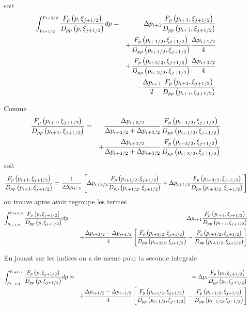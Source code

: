 soit 
\begin{eqnarray*}
\int_{p_{i+1/2}}^{p_{i+3/2}}\frac{F_{p}\left(p,\xi_{j+1/2}\right)}{%
D_{pp}\left(p,\xi_{j+1/2}\right)}dp & = & \Delta p_{i+1}\frac{%
F_{p}\left(p_{i+1},\xi_{j+1/2}\right)}{D_{pp}\left(p_{i+1},\xi_{j+1/2}\right)%
} \\
& & +\frac{F_{p}\left(p_{i+1/2},\xi_{j+1/2}\right)}{D_{pp}\left(p_{i+1/2},%
\xi_{j+1/2}\right)}\frac{\Delta p_{i+1/2}}{4} \\
& & +\frac{F_{p}\left(p_{i+3/2},\xi_{j+1/2}\right)}{D_{pp}\left(p_{i+3/2},%
\xi_{j+1/2}\right)}\frac{\Delta p_{i+3/2}}{4} \\
& & -\frac{\Delta p_{i+1}}{2}\frac{F_{p}\left(p_{i+1},\xi_{j+1/2}\right)}{%
D_{pp}\left(p_{i+1},\xi_{j+1/2}\right)}
\end{eqnarray*}

Comme 
\begin{eqnarray*}
\frac{F_{p}\left(p_{i+1},\xi_{j+1/2}\right)}{D_{pp}\left(p_{i+1},\xi_{j+1/2}%
\right)} & = & \frac{\Delta p_{i+3/2}}{\Delta p_{i+1/2}+\Delta p_{i+3/2}}%
\frac{F_{p}\left(p_{i+1/2},\xi_{j+1/2}\right)}{D_{pp}\left(p_{i+1/2},%
\xi_{j+1/2}\right)} \\
& & +\frac{\Delta p_{i+1/2}}{\Delta p_{i+1/2}+\Delta p_{i+3/2}}\frac{%
F_{p}\left(p_{i+3/2},\xi_{j+1/2}\right)}{D_{pp}\left(p_{i+3/2},\xi_{j+1/2}%
\right)}
\end{eqnarray*}
soit 
\[
\frac{F_{p}\left(p_{i+1},\xi_{j+1/2}\right)}{D_{pp}\left(p_{i+1},\xi_{j+1/2}%
\right)}=\frac{1}{2\Delta p_{i+1}}\left[\Delta p_{i+3/2}\frac{%
F_{p}\left(p_{i+1/2},\xi_{j+1/2}\right)}{D_{pp}\left(p_{i+1/2},\xi_{j+1/2}%
\right)}+\Delta p_{i+1/2}\frac{F_{p}\left(p_{i+3/2},\xi_{j+1/2}\right)}{%
D_{pp}\left(p_{i+3/2},\xi_{j+1/2}\right)}\right]
\]
on trouve apres avoir regroupe les termes 
\begin{eqnarray*}
\int_{p_{i+1/2}}^{p_{i+3/2}}\frac{F_{p}\left(p,\xi_{j+1/2}\right)}{%
D_{pp}\left(p,\xi_{j+1/2}\right)}dp & = & \Delta p_{i+1}\frac{%
F_{p}\left(p_{i+1},\xi_{j+1/2}\right)}{D_{pp}\left(p_{i+1},\xi_{j+1/2}\right)%
} \\
& & +\frac{\Delta p_{i+3/2}-\Delta p_{i+1/2}}{4}\left[\frac{%
F_{p}\left(p_{i+3/2},\xi_{j+1/2}\right)}{D_{pp}\left(p_{i+3/2},\xi_{j+1/2}%
\right)}-\frac{F_{p}\left(p_{i+1/2},\xi_{j+1/2}\right)}{D_{pp}%
\left(p_{i+1/2},\xi_{j+1/2}\right)}\right]
\end{eqnarray*}

En jouant sur les indices on a de meme pour la seconde integrale

\begin{eqnarray*}
\int_{p_{i-1/2}}^{p_{i+1/2}}\frac{F_{p}\left(p,\xi_{j+1/2}\right)}{%
D_{pp}\left(p,\xi_{j+1/2}\right)}dp & \approx & =\Delta p_{i}\frac{%
F_{p}\left(p_{i},\xi_{j+1/2}\right)}{D_{pp}\left(p_{i},\xi_{j+1/2}\right)} \\
& & +\frac{\Delta p_{i+1/2}-\Delta p_{i-1/2}}{4}\left[\frac{%
F_{p}\left(p_{i+1/2},\xi_{j+1/2}\right)}{D_{pp}\left(p_{i+1/2},\xi_{j+1/2}%
\right)}-\frac{F_{p}\left(p_{i-1/2},\xi_{j+1/2}\right)}{D_{pp}%
\left(p_{i-1/2},\xi_{j+1/2}\right)}\right]
\end{eqnarray*}

